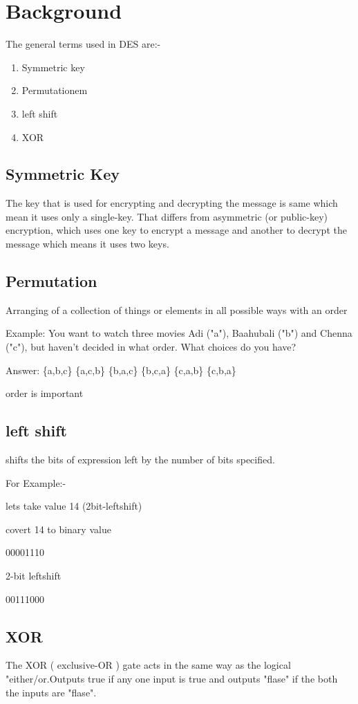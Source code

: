 \documentclass[11pt]{article}
\begin{document}
\section{Background}\label{background_label}
The general terms used in DES are:-
\begin{enumerate} 
	\item Symmetric key
	\item Permutationem
	\item left shift
	\item XOR
\end{enumerate}
\subsection{Symmetric Key}
The key that is used for encrypting and decrypting the message is same which mean it uses only a single-key. 
That differs from asymmetric (or public-key) encryption, which uses one key to encrypt a message and another to decrypt the message which means it uses two keys.

\subsection{Permutation}
Arranging of a collection of things or elements in all possible ways with an order
 
Example: You want to watch three movies Adi ("a"), Baahubali ("b") and Chenna ("c"), but haven't decided in what order. What choices do you have?

Answer: \{a,b,c\} \{a,c,b\} \{b,a,c\} \{b,c,a\} \{c,a,b\} \{c,b,a\}

order is important

\subsection{left shift}
 shifts the bits of expression left by the number of bits specified.\newline
 
 
 For Example:-
 
 
 lets take value 14 (2bit-leftshift)
 
 
covert 14 to binary value


 00001110 

 2-bit leftshift

 00111000
 
\subsection{XOR}
The XOR ( exclusive-OR ) gate acts in the same way as the logical "either/or.Outputs true if  any one input is true 
and outputs "flase" if the both the inputs are "flase".
\end{document}
